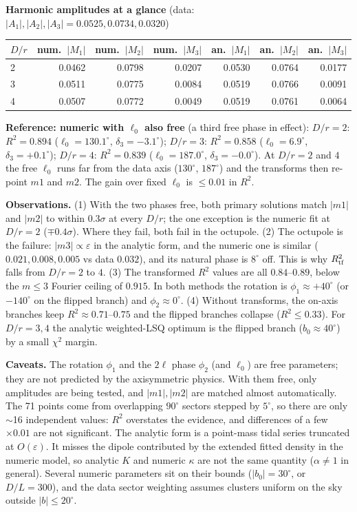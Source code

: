 \documentclass[10pt]{article}
\begin{document}
\textbf{Harmonic amplitudes at a glance} (data: $|A_1|,|A_2|,|A_3|=0.0525, 0.0734, 0.0320$)
\begin{center}\small\begin{tabular}{lrrrrrr}\toprule $D/r$ & num.\ $|M_1|$ & num.\ $|M_2|$ & num.\ $|M_3|$ & an.\ $|M_1|$ & an.\ $|M_2|$ & an.\ $|M_3|$\\\midrule
2 & 0.0462 & 0.0798 & 0.0207 & 0.0530 & 0.0764 & 0.0177\\
3 & 0.0511 & 0.0775 & 0.0084 & 0.0519 & 0.0766 & 0.0091\\
4 & 0.0507 & 0.0772 & 0.0049 & 0.0519 & 0.0761 & 0.0064\\
\bottomrule\end{tabular}\end{center}
\textbf{Reference: numeric with $\ell_0$ also free} (a third free phase in effect): $D/r=2$: $R^2=0.894$ ($\ell_0=130.1^\circ$, $\delta_3=-3.1^\circ$); $D/r=3$: $R^2=0.858$ ($\ell_0=6.9^\circ$, $\delta_3=+0.1^\circ$); $D/r=4$: $R^2=0.839$ ($\ell_0=187.0^\circ$, $\delta_3=-0.0^\circ$). At $D/r=2$ and $4$ the free $\ell_0$ runs far from the data axis ($130^\circ$, $187^\circ$) and the transforms then re-point $m1$ and $m2$. The gain over fixed $\ell_0$ is $\le0.01$ in $R^2$.

\medskip\textbf{Observations.}
(1) With the two phases free, both primary solutions match $|m1|$ and $|m2|$ to within $0.3\sigma$ at every $D/r$; the one exception is the numeric fit at $D/r=2$ ($\mp0.4\sigma$). Where they fail, both fail in the octupole.
(2) The octupole is the failure: $|m3|\propto\varepsilon$ in the analytic form, and the numeric one is similar ($0.021, 0.008, 0.005$ vs data $0.032$), and its natural phase is $8^\circ$ off. This is why $R^2_{\rm tf}$ falls from $D/r=2$ to $4$.
(3) The transformed $R^2$ values are all $0.84$--$0.89$, below the $m\le3$ Fourier ceiling of $0.915$. In both methods the rotation is $\phi_1\approx+40^\circ$ (or $-140^\circ$ on the flipped branch) and $\phi_2\approx0^\circ$.
(4) Without transforms, the on-axis branches keep $R^2\approx0.71$--$0.75$ and the flipped branches collapse ($R^2\le0.33$). For $D/r=3,4$ the analytic weighted-LSQ optimum is the flipped branch ($b_0\approx40^\circ$) by a small $\chi^2$ margin.

\medskip\textbf{Caveats.}
The rotation $\phi_1$ and the $2\ell$ phase $\phi_2$ (and $\ell_0$) are free parameters; they are not predicted by the axisymmetric physics. With them free, only amplitudes are being tested, and $|m1|,|m2|$ are matched almost automatically.
The 71 points come from overlapping $90^\circ$ sectors stepped by $5^\circ$, so there are only $\sim$16 independent values: $R^2$ overstates the evidence, and differences of a few $\times0.01$ are not significant.
The analytic form is a point-mass tidal series truncated at $O(\varepsilon)$. It misses the dipole contributed by the extended fitted density in the numeric model, so analytic $K$ and numeric $\kappa$ are not the same quantity ($\alpha\ne1$ in general).
Several numeric parameters sit on their bounds ($|b_0|=30^\circ$, or $D/L=300$), and the data sector weighting assumes clusters uniform on the sky outside $|b|\le20^\circ$.
\end{document}
